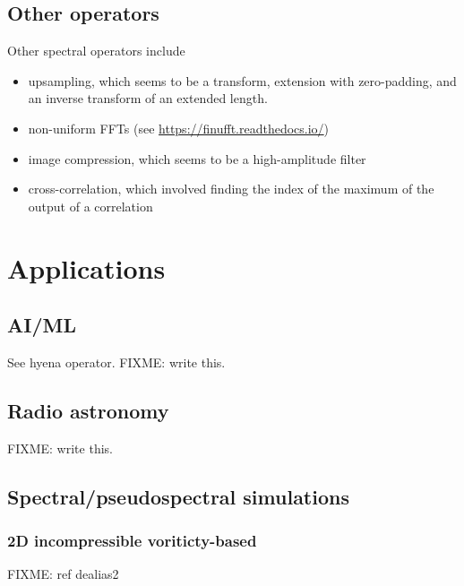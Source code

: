 \documentclass[12pt]{article}
\renewcommand{\(}{\left(}
\renewcommand{\)}{\right)}
\begin{document}
\subsection{Other operators}

Other spectral operators include
\begin{itemize}
\item upsampling, which seems to be a transform, extension with zero-padding, and an inverse transform of an extended length.
\item non-uniform FFTs (see \url{https://finufft.readthedocs.io/})
\item image compression, which seems to be a high-amplitude filter
\item cross-correlation, which involved finding the index of the
  maximum of the output of a correlation
\end{itemize}

\section{Applications}

\subsection{AI/ML}

See hyena operator. FIXME: write this.

\subsection{Radio astronomy}

FIXME: write this.

\subsection{Spectral/pseudospectral simulations}

\subsubsection{2D incompressible voriticty-based}

FIXME: ref dealias2
\end{document}
